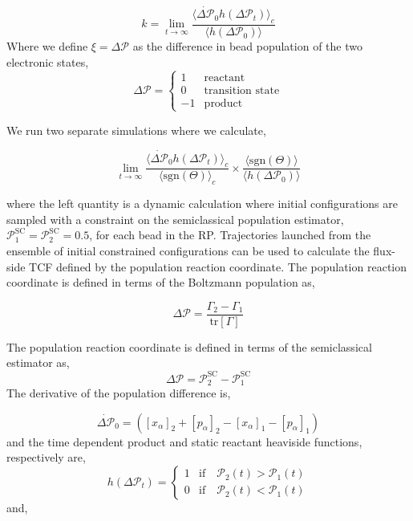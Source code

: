 \documentclass[phd,tocprelim]{cornell}
\begin{document}
\begin{equation}
k= \lim_{t \to \infty}\frac{\langle \dot{\Delta \mathcal{P}}_0 h(\Delta \mathcal{P}_t) \rangle_c}{\langle h(\Delta \mathcal{P}_0)\rangle} 
\end{equation}
Where we define $\xi = \Delta \mathcal{P}$ as the difference in bead population of the two electronic states, 
\begin{equation}
    \Delta \mathcal{P}=\left\{
     \begin{array}{ll}
     1 & \textrm{reactant}\\
     0 & \textrm{transition state}\\
     -1& \textrm{product}
    \end{array}\right.
    \label{eq:hs}
\end{equation}

We run two separate simulations where we calculate, 

\begin{equation}
 \lim_{t \to \infty}\frac{\langle \dot{\Delta \mathcal{P}}_0 h(\Delta \mathcal{P}_t) \rangle_c}{\langle \textrm{sgn}(\Theta)  \rangle_c} \times\frac{\langle \textrm{sgn}(\Theta)\rangle}{\langle  h(\Delta \mathcal{P}_0)\rangle}
\end{equation}

where the left quantity is a dynamic calculation where initial configurations are sampled with a constraint on the semiclassical population estimator, $\mathcal{P}_1^{\textrm{SC}} =\mathcal{P}_2^{\textrm{SC}}=0.5$, for each bead in the RP. Trajectories launched from the ensemble of initial constrained configurations can be used to calculate the flux-side TCF defined by the population reaction coordinate.  The population reaction coordinate is defined in terms of the Boltzmann population as, 

\begin{equation}
\Delta \mathcal{P}=\frac{\Gamma_2-\Gamma_1}{\textrm{tr}[\Gamma]}
\end{equation}

The population reaction coordinate is defined in terms of the semiclassical estimator as, 
\begin{equation}
\Delta \mathcal{P}= \mathcal{P}_2^{\textrm{SC}}-\mathcal{P}_1^{\textrm{SC}}
\end{equation} 
 The derivative of the population difference is,
 
\begin{equation}
\dot{\Delta \mathcal{P}}_0= ([x_{\alpha}]_2+[p_{\alpha}]_2-[x_{\alpha}]_1-[p_{\alpha}]_1)
\end{equation}
and the time dependent product and static reactant heaviside functions, respectively are,
\begin{equation}
   h( \Delta \mathcal{P}_t)=\left\{
     \begin{array}{ll}
     1 & \textrm{if} \quad \mathcal{P}_2(t)>\mathcal{P}_1(t)\\
     0 &  \textrm{if} \quad  \mathcal{P}_2(t)<\mathcal{P}_1(t)
    \end{array}\right.
    \label{eq:hs}
\end{equation}
and, 
\end{document}
